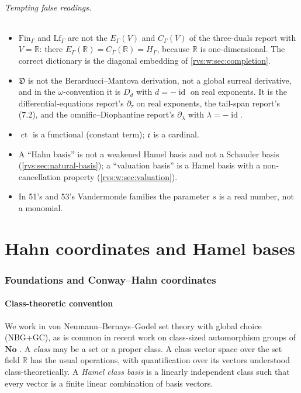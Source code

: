 \documentclass[11pt,letterpaper]{article}
\numberwithin{equation}{section}
\theoremstyle{definition}
\theoremstyle{remark}
\newcommand{\No}{\mathbf{No}}
\newcommand{\R}{\mathbb{R}}
\newcommand{\id}{\operatorname{id}}
\newcommand{\ct}{\operatorname{ct}}
\newcommand{\cont}{\mathfrak c}%
\newcommand{\EuD}{\mathfrak D}%
\newcommand{\FinS}[1]{\mathrm{Fin}_{#1}}%
\newcommand{\LfS}[1]{\mathrm{Lf}_{#1}}%
\begin{document}
\paragraph{Tempting false readings.}
\begin{itemize}
\item \(\FinS\Gamma\) and \(\LfS\Gamma\) are not the \(E_\Gamma(V)\) and
\(C_\Gamma(V)\) of the three-duals report with \(V=\R\): there
\(E_\Gamma(\R)=C_\Gamma(\R)=H_\Gamma\), because \(\R\) is one-dimensional.
The correct dictionary is the diagonal embedding of
\cref{rvs:w:sec:completion}.
\item \(\EuD\) is not the Berarducci--Mantova derivation, not a global
surreal derivative, and in the \(\omega\)-convention it is \(D_d\) with
\(d=-\id\) on real exponents.  It is the differential-equations report's
\(\partial_\tau\) on real exponents, the tail-span report's (7.2), and the
omnific--Diophantine report's \(\partial_\lambda\) with \(\lambda=-\id\).
\item \(\ct\) is a functional (constant term); \(\cont\) is a cardinal.
\item A ``Hahn basis'' is not a weakened Hamel basis and not a Schauder
basis (\cref{rvs:sec:natural-basis}); a ``valuation basis'' is a Hamel basis
with a non-cancellation property (\cref{rvs:w:sec:valuation}).
\item In 51's and 53's Vandermonde families the parameter \(s\) is a real
number, not a monomial.
\end{itemize}


\part{Hahn coordinates and Hamel bases}\label{rvs:w:part:hahn}

\section{Foundations and Conway--Hahn coordinates}\label{rvs:sec:foundations}
\label{rvs:eu:sec:foundations}\label{rvs:cv:sec:foundations}

\subsection{Class-theoretic convention}\label{rvs:subsec:classes}

We work in von Neumann--Bernays--Godel set theory with global choice (NBG+GC),
as is common in recent work on class-sized automorphism groups of \(\No\)
\cite{KKS}.  A \emph{class} may be a set or a proper class.  A class vector
space over the set field \(\R\) has the usual operations, with quantification
over its vectors understood class-theoretically.  A \emph{Hamel class basis}
is a linearly independent class such that every vector is a finite linear
combination of basis vectors.
\end{document}
